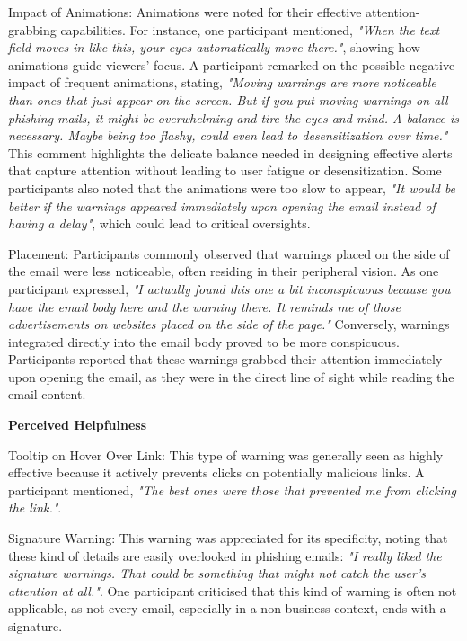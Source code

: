 \documentclass[
  a4paper,  %
  twoside,  %
  bibliography=totoc,
  headsepline,
  cleardoublepage=empty,
  parskip=half,
  draft=false
]{scrbook}
\begin{document}
Impact of Animations: Animations were noted for their effective attention-grabbing capabilities. For instance, one participant mentioned, \textit{"When the text field moves in like this, your eyes automatically move there."}, showing how animations guide viewers' focus. A participant remarked on the possible negative impact of frequent animations, stating, \textit{"Moving warnings are more noticeable than ones that just appear on the screen. But if you put moving warnings on all phishing mails, it might be overwhelming and tire the eyes and mind. A balance is necessary. Maybe being too flashy, could even lead to desensitization over time."} This comment highlights the delicate balance needed in designing effective alerts that capture attention without leading to user fatigue or desensitization. Some participants also noted that the animations were too slow to appear, \textit{"It would be better if the warnings appeared immediately upon opening the email instead of having a delay"}, which could lead to critical oversights. %
    
Placement: Participants commonly observed that warnings placed on the side of the email were less noticeable, often residing in their peripheral vision. As one participant expressed, \textit{"I actually found this one a bit inconspicuous because you have the email body here and the warning there. It reminds me of those advertisements on websites placed on the side of the page."} Conversely, warnings integrated directly into the email body proved to be more conspicuous. Participants reported that these warnings grabbed their attention immediately upon opening the email, as they were in the direct line of sight while reading the email content. 


\textbf{Perceived Helpfulness}

Tooltip on Hover Over Link: This type of warning was generally seen as highly effective because it actively prevents clicks on potentially malicious links. A participant mentioned, \textit{"The best ones were those that prevented me from clicking the link."}.
    
Signature Warning: This warning was appreciated for its specificity, noting that these kind of details are easily overlooked in phishing emails: \textit{"I really liked the signature warnings. That could be something that might not catch the user’s attention at all."}. One participant criticised that this kind of warning is often not applicable, as not every email, especially in a non-business context, ends with a signature.
    
\end{document}
